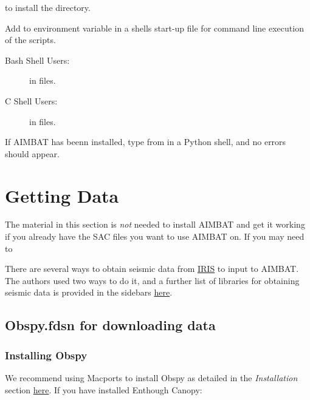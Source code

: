 \documentclass[letterpaper,10pt,english]{sphinxmanual}
\begin{document}
to install the  directory.

Add  to environment variable  in a shells start-up file for command line execution of the scripts.
\begin{description}
\item[{Bash Shell Users:}] \leavevmode
{} in  files.

\item[{C Shell Users:}] \leavevmode
{} in  files.

\end{description}

If AIMBAT has beenn installed, type from  in a Python shell, and no errors should appear.


\chapter{Getting Data}
\label{docfiles/gettingData:getting-data}\label{docfiles/gettingData::doc}
The material in this section is \emph{not} needed to install AIMBAT and get it working if you already have the SAC files you want to use AIMBAT on. If you may need to

There are several ways to obtain seismic data from \href{http://www.iris.edu/dms/nodes/dmc/data/types/waveform-data/}{IRIS} to input to AIMBAT. The authors used two ways to do it, and a further list of libraries for obtaining seismic data is provided in the sidebars \href{http://www.iris.edu/dms/nodes/dmc/data/types/waveform-data/}{here}.


\section{Obspy.fdsn for downloading data}
\label{docfiles/gettingData:obspy-fdsn-for-downloading-data}

\subsection{Installing Obspy}
\label{docfiles/gettingData:installing-obspy}
We recommend using Macports to install Obspy as detailed in the \emph{Installation} section \href{https://github.com/obspy/obspy/wiki}{here}. If you have installed Enthough Canopy:
\end{document}
